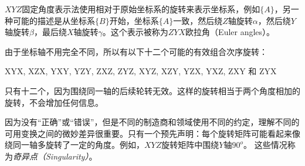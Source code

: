 $XYZ$固定角度表示法使用相对于原始坐标系的旋转来表示坐标系，例如$\{A\}$，另一种可能的描述是从坐标系$\{B\}$开始，坐标系$\{A\}$一致，然后绕$Z$轴旋转$\alpha$，然后绕$Y$轴旋转$\beta$，最后绕$X$轴旋转$\gamma$。这个表示被称为$ZYX$欧拉角（Euler angles）。


由于坐标轴不用完全不同，所以有以下十二个可能的有效组合次序旋转：
\begin{center}
XYX, XZX, YXY, YZY, ZXZ, ZYZ, XYZ, XZY, YZX, YXZ, ZXY 和 ZYX
\end{center}

只有十二个，因为围绕同一轴的后续轮转无效。这样的旋转相当于两个角度相加的旋转，不会增加任何信息。


因为没有“正确”或“错误”，但是不同的制造商和领域使用不同的约定，理解不同的可用变换之间的微妙差异很重要。只有一个预先声明：每个旋转矩阵可能看起来像绕同一轴多旋转了一定的角度。例如，$XYZ$旋转矩阵中围绕$Y$轴$90^o$。 这些情况称为\emph{奇异点（Singularity）}。


